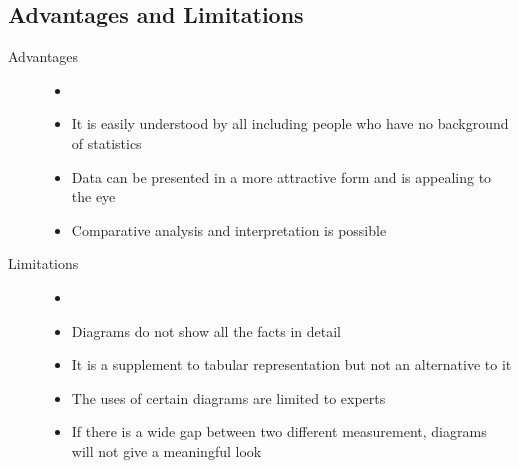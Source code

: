\documentclass[
10pt, %
a4paper, %
]{report}
\begin{document}
\subsection*{Advantages and Limitations}
\begin{description}
\item[Advantages]
\begin{itemize}
\item[]
\item It is easily understood by all including people who have no background of statistics
\item Data can be presented in a more attractive form and is appealing to the eye
\item Comparative analysis and interpretation is possible
\end{itemize}
\item[Limitations]
\begin{itemize}
\item[]
\item Diagrams do not show all the facts in detail
\item It is a supplement to tabular representation but not an alternative to it
\item The uses of certain diagrams are limited to
experts
\item If there is a wide gap between two different measurement, diagrams will not give a
meaningful look
\end{itemize}
\end{description}
\end{document}
